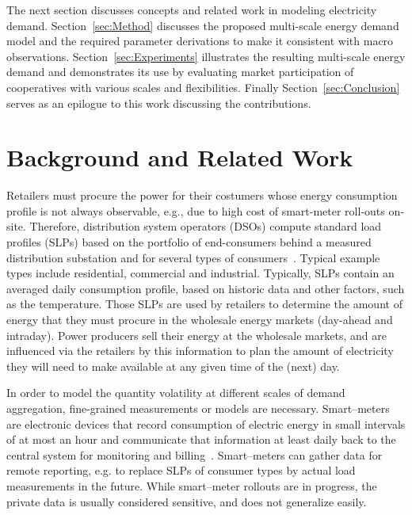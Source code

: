 \documentclass[conference]{IEEEtran}
\begin{document}
The next section discusses concepts and related work in modeling electricity demand. Section~\ref{sec:Method} discusses the proposed multi-scale energy demand model and the required parameter derivations to make it consistent with macro observations. Section~\ref{sec:Experiments} illustrates the resulting multi-scale energy demand and demonstrates its use by evaluating market participation of cooperatives with various scales and flexibilities. Finally Section~\ref{sec:Conclusion} serves as an epilogue to this work discussing the contributions.

\section{Background and Related Work}
\label{sec:Related}

Retailers must procure the power for their costumers whose energy consumption profile is not always observable, e.g., due to high cost of smart-meter roll-outs on-site.
Therefore, distribution system operators (DSOs) compute standard load profiles (SLPs) based on the portfolio of end-consumers behind a measured distribution substation and for several types of consumers~\cite{jardini2000daily}. Typical example types include residential, commercial and industrial. Typically, SLPs contain an averaged daily consumption profile, based on historic data and other factors, such as the temperature. Those SLPs are used by retailers to determine the amount of energy that they must procure in the wholesale energy markets (day-ahead and intraday). Power producers sell their energy at the wholesale markets, and are influenced via the retailers by this information to plan the amount of electricity they will need to make available at any given time of the (next) day.

In order to model the quantity volatility at different scales of demand aggregation, fine-grained measurements or models are necessary.
Smart--meters are electronic devices that record consumption of electric energy in small intervals of at most an hour and communicate that information at least daily back to the central system for monitoring and billing~\cite{depuru2011smart}. Smart--meters can gather data for remote reporting, e.g. to replace SLPs of consumer types by actual load measurements in the future. While smart--meter rollouts are in progress, the private data is usually considered sensitive, and does not generalize easily. %
\end{document}
